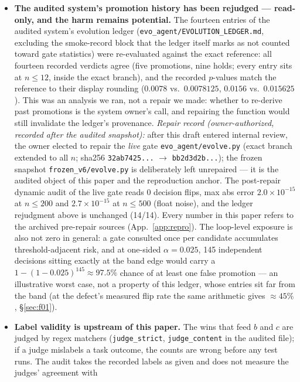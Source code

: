 \documentclass[10pt]{article}
\newcommand{\code}[1]{\texttt{#1}}
\begin{document}
\begin{itemize}
  \item \textbf{The audited system's promotion history has been rejudged ---
  read-only, and the harm remains potential.} The fourteen entries of the
  audited system's evolution ledger
  (\code{evo\_agent/EVOLUTION\_LEDGER.md}, excluding the smoke-record block
  that the ledger itself marks as not counted toward gate statistics) were
  re-evaluated against
  the exact reference: all fourteen recorded verdicts agree (five promotions,
  nine holds; every entry sits at $n\le12$, inside the exact branch), and the
  recorded $p$-values match the reference to their display rounding
  ($0.0078$ vs.\ $0.0078125$, $0.0156$ vs.\ $0.015625$). This was an analysis
  we ran, not a repair we made: whether to re-derive past promotions is the
  system owner's call, and repairing the function would still invalidate the
  ledger's provenance.
  \emph{Repair record (owner-authorized, recorded after the audited
  snapshot):} after this draft entered internal review, the owner elected to repair the
  \emph{live} gate \code{evo\_agent/evolve.py} (exact branch extended to all
  $n$; sha256 \code{32ab7425...} $\to$ \code{bb2d3d2b...}); the frozen
  snapshot \code{frozen\_v6/evolve.py} is deliberately left unrepaired --- it
  is the audited object of this paper and the reproduction anchor. The
  post-repair dynamic audit of the live gate reads 0 decision flips, max abs
  error $2.0\times10^{-15}$ at $n\le200$ and $2.7\times10^{-15}$ at $n\le500$
  (float noise), and
  the ledger rejudgment above is unchanged (14/14). Every number in this paper
  refers to the archived pre-repair sources
  (App.~\ref{app:repro}).
  The loop-level exposure is also not zero in general: a
  gate consulted once per candidate accumulates threshold-adjacent risk, and
  at one-sided $\alpha{=}0.025$, 145 independent decisions sitting exactly at
  the band edge would carry a $1-(1-0.025)^{145} \approx 97.5\%$ chance of at
  least one false promotion --- an illustrative worst case, not a property of
  this ledger, whose entries sit far from the band (at the defect's measured
  flip rate the same arithmetic gives $\approx 45\%$, \S\ref{sec:f01}).
  \item \textbf{Label validity is upstream of this paper.} The wins that feed
  $b$ and $c$ are judged by regex matchers (\code{judge\_strict},
  \code{judge\_content} in the audited file); if a judge mislabels a task
  outcome, the counts are wrong before any test runs. The audit takes the
  recorded labels as given and does not measure the judges' agreement with

\end{itemize}
\end{document}
